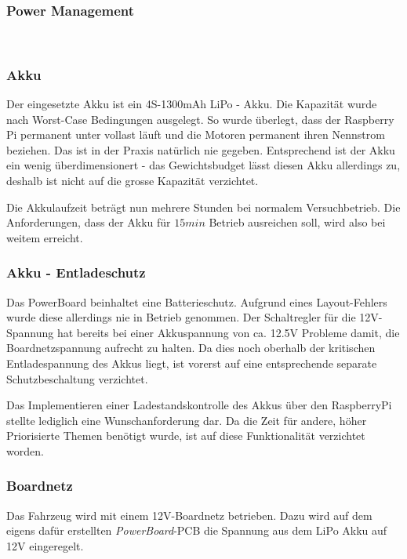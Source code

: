 \documentclass[main.tex]{subfiles} %
\begin{document}

\subsubsection{Power Management}~\label{sec:PowerManagement}

\subsubsection*{Akku}

Der eingesetzte Akku ist ein 4S-1300mAh LiPo - Akku. Die Kapazität wurde nach
Worst-Case Bedingungen ausgelegt. So wurde überlegt, dass der Raspberry Pi
permanent unter vollast läuft und die Motoren permanent ihren Nennstrom
beziehen. Das ist in der Praxis natürlich nie gegeben. Entsprechend ist der
Akku ein wenig überdimensionert - das Gewichtsbudget lässt diesen Akku
allerdings zu, deshalb ist nicht auf die grosse Kapazität verzichtet.


Die Akkulaufzeit beträgt nun mehrere Stunden bei normalem Versuchbetrieb. Die
Anforderungen, dass der Akku für $15min$ Betrieb ausreichen soll, wird also bei
weitem erreicht.

\subsubsection*{Akku - Entladeschutz}

Das PowerBoard beinhaltet eine Batterieschutz. Aufgrund eines Layout-Fehlers
wurde diese allerdings nie in Betrieb genommen. Der Schaltregler für die
12V-Spannung hat bereits bei einer Akkuspannung von ca. 12.5V Probleme damit,
die Boardnetzspannung aufrecht zu halten. Da dies noch oberhalb der kritischen
Entladespannung des Akkus liegt, ist vorerst auf eine entsprechende separate
Schutzbeschaltung verzichtet.

Das Implementieren einer Ladestandskontrolle des Akkus über den RaspberryPi
stellte lediglich eine Wunschanforderung dar. Da die Zeit für andere, höher
Priorisierte Themen benötigt wurde, ist auf diese Funktionalität verzichtet
worden.

\subsubsection*{Boardnetz}

Das Fahrzeug wird mit einem 12V-Boardnetz betrieben. Dazu wird auf dem eigens
dafür erstellten \textit{PowerBoard}-PCB die Spannung aus dem LiPo Akku auf 12V
eingeregelt.
\end{document}

